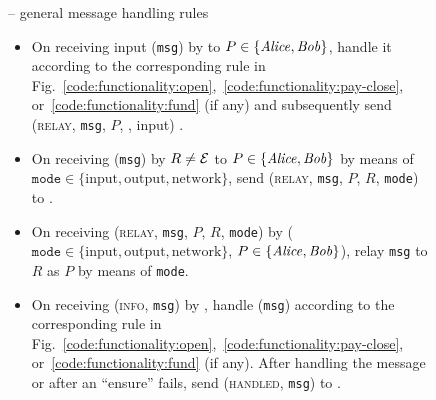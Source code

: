 
\begin{figure}[H]
  \begin{systembox}{\fchan{} -- general message handling rules}
    \begin{itemize}
      \item On receiving input (\texttt{msg}) by \environment to $P \in
      \{\mathit{Alice}, \mathit{Bob}\}$, handle it according to the corresponding rule in
      Fig.~\ref{code:functionality:open},~\ref{code:functionality:pay-close},
      or~\ref{code:functionality:fund} (if any) and subsequently send
      (\textsc{relay}, \texttt{msg}, $P$, \environment, input) \adversary.
      \item On receiving (\texttt{msg}) by $R \neq \mathcal{E}$ to $P \in
      \{\mathit{Alice}, \mathit{Bob}\}$ by means of $\texttt{mode} \in \{\mathrm{input},
      \mathrm{output}, \mathrm{network}\}$, send (\textsc{relay}, \texttt{msg},
      $P$, $R$, \texttt{mode}) to \adversary.  
      \item On receiving (\textsc{relay}, \texttt{msg}, $P$, $R$, \texttt{mode})
      by \adversary ($\texttt{mode} \in \{\mathrm{input}, \mathrm{output},
      \mathrm{network}\}$, $P \in \{\mathit{Alice}, \mathit{Bob}\}$), relay \texttt{msg} to $R$
      as $P$ by means of \texttt{mode}. 
      \item On receiving (\textsc{info}, \texttt{msg}) by \adversary, handle
      (\texttt{msg}) according to the corresponding rule in
      Fig.~\ref{code:functionality:open},~\ref{code:functionality:pay-close},
      or~\ref{code:functionality:fund} (if any). After handling the message or
      after an ``ensure'' fails, send (\textsc{handled}, \texttt{msg}) to
      \adversary. 
    \end{itemize}
  \end{systembox}
  \caption{}
  \label{code:functionality:rules}
\end{figure}

